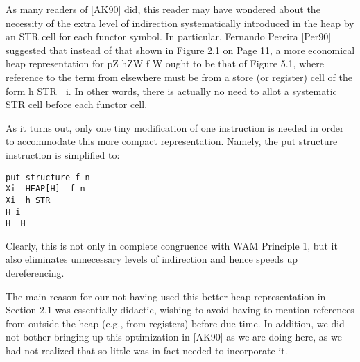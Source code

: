 
As many readers of [AK90] did, this reader may have wondered about the necessity
of the extra level of indirection systematically introduced in the heap by
an STR cell for each functor symbol. In particular, Fernando Pereira [Per90]
suggested that instead of that shown in Figure 2.1 on Page 11, a more economical
heap representation for pZ
hZW
f W
ought to be that of Figure 5.1, where
reference to the term from elsewhere must be from a store (or register) cell of the
form h STR
 i. In other words, there is actually no need to allot a systematic STR
cell before each functor cell.

As it turns out, only one tiny modification of one instruction is needed in order to
accommodate this more compact representation. Namely, the put structure
instruction is simplified to:
\begin{verbatim}
put structure f n
Xi  HEAP[H]  f n
Xi  h STR
H i
H  H  
\end{verbatim}

Clearly, this is not only in complete congruence with WAM Principle 1, but it also
eliminates unnecessary levels of indirection and hence speeds up dereferencing.

The main reason for our not having used this better heap representation in Section
2.1 was essentially didactic, wishing to avoid having to mention references
from outside the heap (e.g., from registers) before due time. In addition, we did
not bother bringing up this optimization in [AK90] as we are doing here, as we
had not realized that so little was in fact needed to incorporate it.

